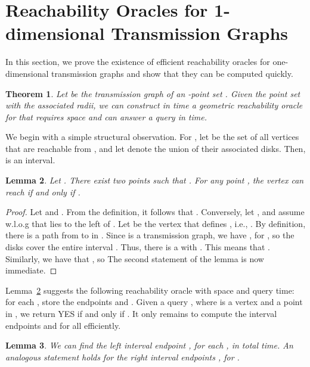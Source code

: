 \documentclass[11pt,a4paper]{paper}
\newtheorem{theorem}{Theorem}[section]
\newtheorem{lemma}[theorem]{Lemma}
\begin{document}
\section{Reachability Oracles for 1-dimensional Transmission Graphs}
\label{sec:1d}
In this section, we prove the existence of efficient reachability
oracles for one-dimensional transmission graphs and show that they
can be computed quickly.
\begin{theorem}
\label{thm:1doracle}
Let  be the transmission graph of an -point set .
Given the point set  with the associated radii,
we can construct in  time a geometric reachability oracle for
 that requires   space and can answer a query in   time.
\end{theorem}

We begin with a simple structural observation. 
For , let 
be the set of all vertices that are reachable from ,
and let  denote the
union of their associated disks. Then,  is an interval.

\begin{lemma}\label{obs:reachIB}
Let . There exist two points  such
that .
For any point , the vertex  can reach  if and only if
.
\end{lemma}

\begin{proof}
Let  and
.
From the definition, it follows that .
Conversely, let , and assume
w.l.o.g that  lies to the left of . Let  be the
vertex that defines , i.e.,
.
By definition, there is a path 
from  to  in .
Since  is a transmission graph, we have ,
for , so the disks
 cover the entire interval . Thus, there is a 
with . This means that .
Similarly, we have that ,
so 
The second statement of the lemma is now immediate.
\end{proof}

Lemma~\ref{obs:reachIB} suggests the following reachability
oracle with  space
and  query time:
for each , store
the endpoints  and . 
Given a query , where  is a vertex and  a point in ,
we return YES if and only if .
It only remains to compute the interval endpoints 
 and  for all  efficiently.

\begin{lemma}
\label{lem:findlr}
We can find the left interval endpoint , 
for each , in  total time.
An analogous statement holds for the right interval 
endpoints , for .
\end{lemma}
\end{document}
